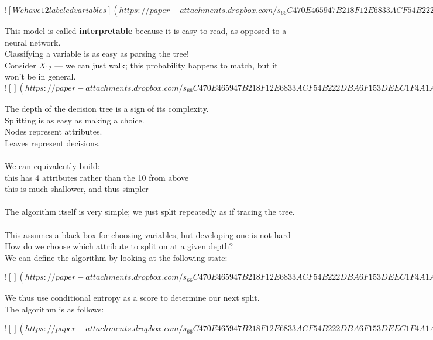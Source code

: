 \documentclass[../../lecture_notes.tex]{subfiles}
\begin{document}
\newpage
$![We have 12 labeled variables](https://paper-attachments.dropbox.com/s_66C470E465947B218F12E6833ACF54B222DBA6F153DEEC1F4A1A4D06909A7A0F_1590914176982_Screen+Shot+2020-05-31+at+1.34.17+AM.png)$
\newpage

\noindent This model is called \textbf{\underline{interpretable}} 
	because it is easy to read, as opposed to a neural network.\\
Classifying a variable is as easy as parsing the tree!\\
	\indent Consider $X_{12}$ — we can just walk; this probability happens to match, but it won’t be in general.\\

\newpage
$![](https://paper-attachments.dropbox.com/s_66C470E465947B218F12E6833ACF54B222DBA6F153DEEC1F4A1A4D06909A7A0F_1590914410089_Screen+Shot+2020-05-31+at+1.34.28+AM.png)$
\newpage

\noindent The depth of the decision tree is a sign of its complexity.\\
Splitting is as easy as making a choice.\\
Nodes represent attributes.\\
Leaves represent decisions.\\
\\
We can equivalently build:\\
	\indent this has 4 attributes rather than the 10 from above\\
	\indent this is much shallower, and thus simpler\\
\\
The algorithm itself is very simple; we just split repeatedly as if tracing the tree.\\
\\
This assumes a black box for choosing variables, but developing one is not hard\\
How do we choose which attribute to split on at a given depth?\\
We can define the algorithm by looking at the following state:

\newpage
$![](https://paper-attachments.dropbox.com/s_66C470E465947B218F12E6833ACF54B222DBA6F153DEEC1F4A1A4D06909A7A0F_1590915632068_Untitled+drawing+14.jpg)$
\newpage

\noindent We thus use conditional entropy as a score to determine our next split.\\

The algorithm is as follows:

\newpage
$![](https://paper-attachments.dropbox.com/s_66C470E465947B218F12E6833ACF54B222DBA6F153DEEC1F4A1A4D06909A7A0F_1590986583122_Untitled+drawing+15.jpg)$
\newpage
\end{document}
